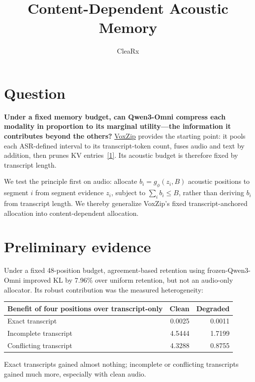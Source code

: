 \documentclass{article}
\title{Content-Dependent Acoustic Memory}
\author{CleaRx}
\begin{document}
\maketitle

\section{Question}

\textbf{Under a fixed memory budget, can Qwen3-Omni compress each modality in proportion to its marginal utility---the information it contributes beyond the others?} \href{https://arxiv.org/html/2608.08569v1}{VoxZip} provides the starting point: it pools each ASR-defined interval to its transcript-token count, fuses audio and text by addition, then prunes KV entries~\hyperlink{ref:voxzip}{[1]}. Its acoustic budget is therefore fixed by transcript length.

We test the principle first on audio: allocate \(b_i=g_\phi(z_i,B)\) acoustic positions to segment \(i\) from segment evidence \(z_i\), subject to \(\sum_i b_i\leq B\), rather than deriving \(b_i\) from transcript length. We thereby generalize VoxZip's fixed transcript-anchored allocation into content-dependent allocation.

\section{Preliminary evidence}

Under a fixed 48-position budget, agreement-based retention using frozen-Qwen3-Omni improved KL by 7.96\% over uniform retention, but not an audio-only allocator. Its robust contribution was the measured heterogeneity:

\begin{center}
\small
\begin{tabular}{lrr}
\toprule
Benefit of four positions over transcript-only & Clean & Degraded \\
\midrule
Exact transcript & 0.0025 & 0.0011 \\
Incomplete transcript & 4.5444 & 1.7199 \\
Conflicting transcript & 4.3288 & 0.8755 \\
\bottomrule
\end{tabular}
\end{center}

Exact transcripts gained almost nothing; incomplete or conflicting transcripts gained much more, especially with clean audio.
\end{document}
